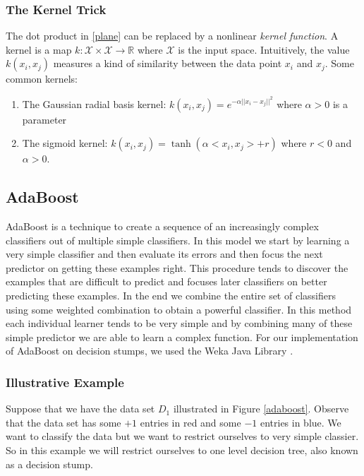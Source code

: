 \documentclass[11pt,oneside,reqno]{amsart}
\theoremstyle{definition}
\theoremstyle{definition}
\theoremstyle{remark}
\numberwithin{equation}{section}
\numberwithin{equation}{section}
\begin{document}
\subsubsection{The Kernel Trick}
The dot product in \ref{plane} can be replaced by a nonlinear \textit{kernel function}. A kernel is a map $k:\mathcal{X}\times \mathcal{X}\longrightarrow \mathbb{R}$ where $\mathcal{X}$ is the input space. Intuitively, the value $k(x_i,x_j)$ measures a kind of similarity between the data point $x_i$ and $x_j$. Some common kernels:
\begin{enumerate}
\item The Gaussian radial basis kernel: $k(x_i,x_j)=e^{-\alpha ||x_i-x_j||^2}$ where $\alpha>0$ is a parameter
\item The sigmoid kernel: $k(x_i,x_j)=\tanh (\alpha <x_i,x_j>+r)$ where $r<0$ and $\alpha>0$. 
\end{enumerate}   
\subsection{AdaBoost}
AdaBoost is a technique to create a sequence of an increasingly complex classifiers out of multiple simple classifiers. In this model we start by learning a very simple classifier and then evaluate its errors and then focus the next predictor on getting these examples right. This procedure tends to discover the examples that are difficult to predict and focuses later classifiers on better predicting these examples. In the end we combine the entire set of classifiers using some weighted combination to obtain a powerful classifier. In this method each individual learner tends to be very simple and by combining  many of these simple predictor we are able to learn a complex function. For our implementation of AdaBoost on decision stumps, we used the Weka Java Library \cite{Weka}.
\subsubsection{Illustrative Example} 
Suppose that we have the data set $D_1$ illustrated in Figure \ref{adaboost}. Observe that the data set has some $+1$ entries in red and some $-1$ entries in blue. We want to classify the data but we want to restrict ourselves to very simple classier. So in this example we will restrict ourselves to one level decision tree, also known as a decision stump.
\end{document}
